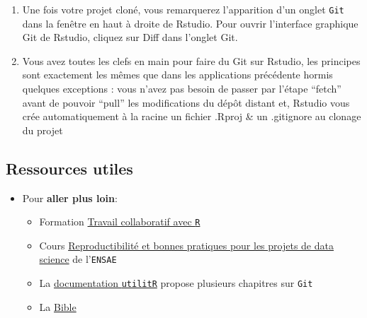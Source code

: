 \documentclass[
  letterpaper,
  DIV=11,
  numbers=noendperiod]{scrartcl}
\providecommand{\tightlist}{%
  \setlength{\itemsep}{0pt}\setlength{\parskip}{0pt}}\usepackage{longtable,booktabs,array}
\begin{document}
\begin{tcolorbox}
\begin{enumerate}
  \begin{itemize}
  \item
    \texttt{File} → \texttt{New\ project} → \texttt{Version\ Control} →
    \texttt{Git}. Entrez vos identifiants GitLab ainsi que le
    \texttt{token} en guise de mots de passe.
  \item
    ATTENTION : il se peut que vous rencontriez un problème avant de
    pouvoir vous identifier (en particulier sur machine virtuelle) avec
    le message d'erreur suivant :
  \item
    ``unable to access SSL certificate problem: unable to get local
    issuer certificate''\\
    Pour régler ce problème, allez dans un \texttt{terminal} et entrez
    la commande :
  \item
    \texttt{git\ config\ -\/-global\ http.sslbackend\ schannel})
  \end{itemize}
\item
  Une fois votre projet cloné, vous remarquerez l'apparition d'un onglet
  \texttt{Git} dans la fenêtre en haut à droite de Rstudio. Pour ouvrir
  l'interface graphique Git de Rstudio, cliquez sur Diff dans l'onglet
  Git.
\item
  Vous avez toutes les clefs en main pour faire du Git sur Rstudio, les
  principes sont exactement les mêmes que dans les applications
  précédente hormis quelques exceptions : vous n'avez pas besoin de
  passer par l'étape ``fetch'' avant de pouvoir ``pull'' les
  modifications du dépôt distant et, Rstudio vous crée automatiquement à
  la racine un fichier .Rproj \& un .gitignore au clonage du projet
\end{enumerate}

\end{tcolorbox}

\hypertarget{ressources-utiles}{%
\subsection{Ressources utiles}\label{ressources-utiles}}

\begin{itemize}
\tightlist
\item
  Pour \textbf{aller plus loin}:

  \begin{itemize}
  \tightlist
  \item
    Formation
    \href{https://collaboratif-git-formation-insee.netlify.app/index.html}{Travail
    collaboratif avec \texttt{R}}
  \item
    Cours
    \href{https://ensae-reproductibilite.netlify.app/}{Reproductibilité
    et bonnes pratiques pour les projets de data science} de
    l'\texttt{ENSAE}
  \item
    La \href{https://www.book.utilitr.org/}{documentation
    \texttt{utilitR}} propose plusieurs chapitres sur \texttt{Git}
  \item
    La \href{https://git-scm.com/book/en/v2}{Bible}
  \end{itemize}
\end{itemize}
\end{document}
